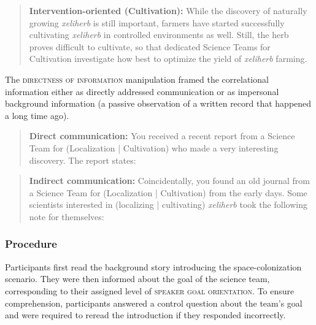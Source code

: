 \documentclass[10pt,letterpaper]{article}
\newcommand{\HW}[1]{\textcolor{glaucous-bright}{[HW: #1]}}
\newcommand{\mf}[1]{\textcolor{BrickRed}{[MF: #1]}}
\begin{document}
\begin{quote}
    \small
    \textbf{Intervention-oriented (Cultivation):}  
    While the discovery of naturally growing \textit{xeliherb} is still important, farmers have started successfully cultivating \textit{xeliherb} in controlled environments as well. Still, the herb proves difficult to cultivate, so that dedicated Science Teams for Cultivation investigate how best to optimize the yield of \textit{xeliherb} farming.    
\end{quote}


The \textsc{directness of information} manipulation framed the correlational information either as directly addressed communication or as impersonal background information (a passive observation of a written record that happened a long time ago). 


\begin{quote}
    \small
    \textbf{Direct communication:}  
    You received a recent report from a Science Team for (Localization | Cultivation) who made a very interesting discovery.  
    The report states:
\end{quote}

\begin{quote}
    \small
    \textbf{Indirect communication:}  
    Coincidentally, you found an old journal from a Science Team for (Localization | Cultivation) from the early days.  
    Some scientists interested in (localizing | cultivating) \textit{xeliherb} took the following note for themselves:
\end{quote}

\subsubsection{Procedure}

Participants first read the background story introducing the space-colonization scenario. They were then informed about the goal of the science team, corresponding to their assigned level of \textsc{speaker goal orientation}. To ensure comprehension, participants answered a control question about the team’s goal and were required to reread the introduction if they responded incorrectly.
\end{document}
